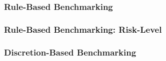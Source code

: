 \documentclass{beamer}
\begin{document}
\begin{frame}
  \frametitle{Rule-Based Benchmarking}
\end{frame}


\begin{frame}
  \frametitle{Rule-Based Benchmarking: Risk-Level}
\end{frame}


\begin{frame}
  \frametitle{Discretion-Based Benchmarking}
\end{frame}
\end{document}
